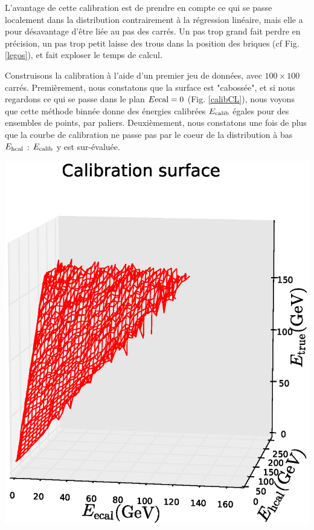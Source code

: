 \documentclass[11pt,a4paper]{article}
\begin{document}
L'avantage de cette calibration est de prendre en compte ce qui se passe localement dans la distribution contrairement à la régression linéaire, mais elle a pour désavantage d'être liée au pas des carrés. Un pas trop grand fait perdre en précision, un pas trop petit laisse des trous dans la position des briques (cf Fig. \ref{legos}), et fait exploser le temps de calcul. 

\noindent
\begin{minipage}{0.60\linewidth}
Construisons la calibration \cite{GitHubCL} à l'aide d'un premier jeu de données, avec $100\times100$ carrés. Premièrement, nous constatons que la surface est "cabossée", et si nous regardons ce qui se passe dans le plan $E{\rm ecal} = 0$ (Fig. \ref{calibCL}), nous voyons que cette méthode binnée donne des énergies calibrées $E_{\rm calib}$ égales pour des ensembles de points, par paliers. Deuxièmement, nous constatons une fois de plus que la courbe de calibration ne passe pas par le coeur de la distribution à bas $E_{\rm hcal}$ : $E_{\rm calib}$ y est sur-évaluée.
\end{minipage}
\hfill
\begin{minipage}{0.4\linewidth}
	\includegraphics[width=\textwidth]{images/pictures/testCalibrationLego/CalibrationLego_plot3D_surf.eps}
	\label{legos}
\end{minipage}
\end{document}

